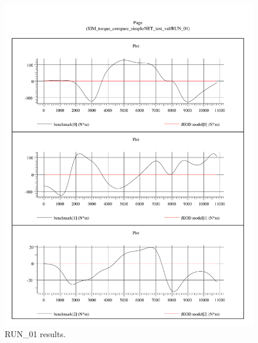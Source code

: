 \begin{figure}[h!]
\centering
\includegraphics[width=6.1in]{figs/run_01.pdf}
\caption{RUN\_01 results.}
\label{fig:run01_results}
\end{figure}
\newpage

